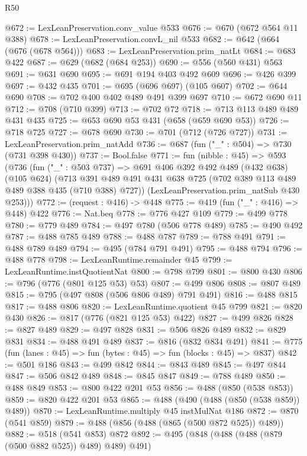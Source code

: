 \begin{lexlean}{R50}
\begin{coremodule}
@672 := LexLeanPreservation.conv_value @533
@676 := @670 (@672 @564 @11 @388)
@678 := LexLeanPreservation.convL_nil @533
@682 := @642 (@664 (@676 (@678 @564)))
@683 := LexLeanPreservation.prim_natLt
@684 := @683 @422
@687 := @629 (@682 (@684 @253))
@690 := @556 (@560 @431) @563
@691 := @631 @690
@695 := @691 @194 @403 @492 @609
@696 := @426 @399
@697 := @432 @435
@701 := @695 (@696 @697) (@105 @607)
@702 := @644 @690
@708 := @702 @400 @402 @489 @491 @399 @697
@710 := @672 @690 @11
@712 := @708 (@710 @399)
@713 := @702 @72
@718 := @713 @113 @489 @489 @431 @435
@725 := @653 @690 @53 @431 (@658 (@659 @690 @53))
@726 := @718 @725
@727 := @678 @690
@730 := @701 (@712 (@726 @727))
@731 := LexLeanPreservation.prim_natAdd
@736 := @687 (fun ("_" : @504) => @730 (@731 @398 @430))
@737 := Bool.false
@771 := fun (nibble : @45) =>
  @593
    (@736
      (fun ("_" : @503 @737) =>
      @691
        @406
        @392
        @492
        @489
        (@432 @638)
        (@105 @624)
        (@713 @391 @489 @491 @431 @638 @725 (@702 @389 @113 @489 @489 @388 @435 (@710 @388) @727))
        (LexLeanPreservation.prim_natSub @430 @253)))
@772 := (request : @416) -> @448
@775 := @419 (fun ("_" : @416) => @448) @422
@776 := Nat.beq
@778 := @776 @427 @109
@779 := @499 @778
@780 := @779 @489
@784 := @497 @780 (@506 @778 @489)
@785 := @490 @492
@787 := @488 @785 @489
@788 := @488 @787
@789 := @788 @491
@791 := @488 @789 @489
@794 := @495 (@784 @791 @491)
@795 := @488 @794
@796 := @488 @778
@798 := LexLeanRuntime.remainder @45
@799 := LexLeanRuntime.instQuotientNat
@800 := @798 @799
@801 := @800 @430
@806 := @796 (@776 (@801 @125 @53) @53)
@807 := @499 @806
@808 := @807 @489
@815 := @795 (@497 @808 (@506 @806 @489) @791 @491)
@816 := @488 @815
@817 := @488 @806
@820 := LexLeanRuntime.quotient @45 @799
@821 := @820 @430
@826 := @817 (@776 (@821 @125 @53) @422)
@827 := @499 @826
@828 := @827 @489
@829 := @497 @828
@831 := @506 @826 @489
@832 := @829 @831
@834 := @488 @491 @489
@837 := @816 (@832 @834 @491)
@841 := @775 (fun (lanes : @45) => fun (bytes : @45) => fun (blocks : @45) => @837)
@842 := @501 @186
@843 := @499 @842
@844 := @843 @489
@845 := @497 @844
@847 := @506 @842 @489
@848 := @845 @847
@849 := @788 @489
@850 := @488 @849
@853 := @800 @422 @201 @53
@856 := @488 (@850 (@538 @853))
@859 := @820 @422 @201 @53
@865 := @488 (@490 (@488 (@850 (@538 @859)) @489))
@870 := LexLeanRuntime.multiply @45 instMulNat @186
@872 := @870 (@541 @859)
@879 := @488 (@856 (@488 (@865 (@500 @872 @525)) @489))
@882 := @518 (@541 @853) @872
@892 := @495 (@848 (@488 (@488 (@879 (@500 @882 @525)) @489) @489) @491)

\end{coremodule}
\end{lexlean}
